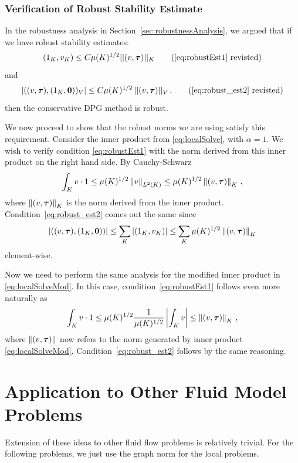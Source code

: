 \documentclass[Proposal.tex]{subfiles}
\begin{document}
\subsubsection{Verification of Robust Stability Estimate}
In the robustness analysis in Section~\ref{sec:robustnessAnalysis}, we argued
that if we have robust stability estimates:
\begin{equation}
(1_K, v_K) \leq C \mu(K)^{1/2} || (v,\bftau) ||_K
\tag{\ref{eq:robustEst1} revisted}
\end{equation}
and
\begin{equation}
| ((v,\bftau),(1_K,{\bf 0}))_V | \leq C \mu(K)^{1/2} \, || (v,\bftau) ||_V\,.
\tag{\ref{eq:robust_est2} revisted}
\end{equation}
then the conservative DPG method is robust.

We now proceed to show that the robust norms we are using satisfy this
requirement.
Consider the inner product from \eqref{eq:localSolve}, with
$\alpha=1$. We wish to
verify condition \eqref{eq:robustEst1} with the norm derived from this inner
product on the right hand side. By Cauchy-Schwarz
\begin{equation}
   \int_K v\cdot
   1\leq\mu(K)^{1/2}\left\| v \right\|_{L^2(K)}\leq\mu(K)^{1/2}\left\| (v,\boldsymbol\tau) \right\|_K\,,
   \label{eq:robustProof}
\end{equation}
where $\left\| (v,\boldsymbol\tau) \right\|_K$ is the norm derived from the inner product.
Condition~\eqref{eq:robust_est2} comes out the same since
$$|(
(v,\boldsymbol\tau),(1_K,{\bf0}))| \leq
\sum_K|(1_K,v_K)|\leq\sum_K\mu(K)^{1/2}\left\| (v,\boldsymbol\tau) \right\|_K
$$
element-wise.

Now we need to perform the same analysis for the modified inner product in
\eqref{eq:localSolveMod}. In this case,
condition~\eqref{eq:robustEst1} follows even more naturally as
\begin{equation}
   \int_K v\cdot1\leq\mu(K)^{1/2}\frac{1}{\mu(K)^{1/2}}\left| \int_Kv \right|
   \leq\left\| (v,\boldsymbol\tau) \right\|_K\,,
   \label{eq:robustProof2}
\end{equation}
where $\left\| (v,\boldsymbol\tau) \right\|$ now refers to the norm generated by inner product
\eqref{eq:localSolveMod}. Condition~\eqref{eq:robust_est2} follows by the same
reasoning.

\section{Application to Other Fluid Model Problems}
Extension of these ideas to other fluid flow problems is relatively trivial.
For the following problems, we just use the graph norm for the local problems.
\end{document}
